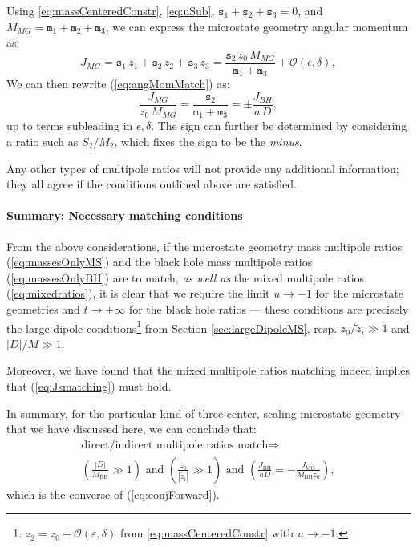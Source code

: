 \documentclass[12pt,a4paper]{article}
\newcommand{\bgdeb}[1]{\textbf{\textit{\textcolor{cyan}{(BG: #1)}}}}
\newcommand{\be}{\begin{equation}}
\newcommand{\ee}{\end{equation}}
\newcommand{\mm}{\mathtt{m}}
\newcommand{\sm}{\mathtt{s}}
\begin{document}
Using \eqref{eq:massCenteredConstr}, \eqref{eq:uSub}, $\sm_1+\sm_2+\sm_3=0$, and $M_{MG}=\mm_1+\mm_2+\mm_3$, we can express the microstate geometry angular momentum as:
\begin{equation}
J_{MG}=\sm_1\,z_1+\sm_2\,z_2+\sm_3\,z_3=\frac{\sm_2\,z_0\,M_{MG}}{\mm_1+\mm_3}+\mathcal{O}(\epsilon,\delta),
\end{equation}
We can then rewrite (\ref{eq:angMomMatch}) as:
\begin{equation}\label{eq:JJrewrite}
\frac{J_{MG}}{z_0\,M_{MG}}=\frac{\sm_2}{\mm_1+\mm_3}=\pm\frac{J_{BH}}{a\,D},
\end{equation}
up to terms subleading in $\epsilon,\delta$. The sign can further be determined by considering a ratio such as $S_2/M_2$, which fixes the sign to be the \textit{minus}.

Any other types of multipole ratios will not provide any additional information; they all agree if the conditions outlined above are satisfied.

\paragraph{Summary: Necessary matching conditions}
From the above considerations, if the microstate geometry mass multipole ratios (\ref{eq:massesOnlyMS}) and the black hole mass multipole ratios (\ref{eq:massesOnlyBH})  are to match, \emph{as well as} the mixed multipole ratios (\ref{eq:mixedratios}), it is clear that we require the limit $u\rightarrow -1$ for the microstate geometries and $t\rightarrow\pm\infty$ for the black hole ratios --- these conditions are precisely the large dipole conditions\footnote{$z_2=z_0+\mathcal{O}(\varepsilon,\delta)$ from \eqref{eq:massCenteredConstr} with $u\rightarrow-1$.} from Section \ref{sec:largeDipoleMS}, resp. $z_0/\tilde z_i\gg 1$ and $|D|/M\gg 1$.

Moreover, we have found that the mixed multipole ratios matching indeed implies that (\ref{eq:Jsmatching}) must hold. 



In summary, for the particular kind of three-center, scaling microstate geometry that we have discussed here, we can conclude that:
\be \begin{aligned} \label{eq:conjBackward}
\text{direct/indirect multipole ratios match} \Rightarrow\\
\left(\frac{|D|}{M_\text{BH}}\gg 1\right) \text{ and } \left(\frac{z_0}{|\tilde z_i|}\gg 1\right) \text{ and } \left(\frac{J_\text{BH}}{aD} = -\frac{J_{\text{MG}}}{M_\text{BH}z_0}\right),
 \end{aligned}\ee
 which is the converse of (\ref{eq:conjForward}).
\end{document}
